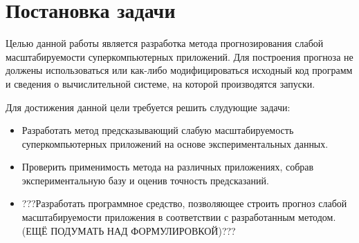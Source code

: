 \chapter{Постановка задачи}
	Целью данной работы является разработка метода прогнозирования слабой масштабируемости суперкомпьютерных приложений. Для построения прогноза не должены использоваться или как-либо модифицироваться исходный код программ и сведения о вычислительной системе, на которой производятся запуски.

	Для достижения данной цели требуется решить слудующие задачи:
	\begin{itemize}
		\item Разработать метод предсказывающий слабую масштабируемость суперкомпьютерных приложений на основе экспериментальных данных.
		\item Проверить применимость метода на различных приложениях, собрав экспериментальную базу и оценив точность предсказаний.
		\item ???Разработать программное средство, позволяющее строить прогноз слабой масштабируемости приложения в соответствии с разработанным методом.(ЕЩЁ ПОДУМАТЬ НАД ФОРМУЛИРОВКОЙ)???
	\end{itemize}


\clearpage
